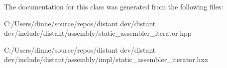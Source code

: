The documentation for this class was generated from the following files\+:\begin{DoxyCompactItemize}
\item 
C\+:/\+Users/dinne/source/repos/distant dev/distant dev/include/distant/assembly/static\+\_\+assembler\+\_\+iterator.\+hpp\item 
C\+:/\+Users/dinne/source/repos/distant dev/distant dev/include/distant/assembly/impl/static\+\_\+assembler\+\_\+iterator.\+hxx\end{DoxyCompactItemize}
